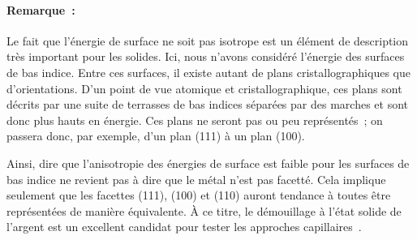\paragraph*{Remarque~:} Le fait que l'énergie de surface ne soit pas isotrope est un élément de description très important pour les solides. Ici, nous n'avons considéré l'énergie des surfaces de bas indice. Entre ces surfaces, il existe autant de plans cristallographiques que d'orientations. D'un point de vue atomique et cristallographique, ces plans sont décrits par une suite de terrasses de bas indices séparées par des marches et sont donc plus hauts en énergie. Ces plans ne seront pas ou peu représentés~; on passera donc, par exemple, d'un plan (111) à un plan (100).\par 
Ainsi, dire que l'anisotropie des énergies de surface est faible pour les surfaces de bas indice ne revient pas à dire que le métal n'est pas facetté. Cela implique seulement que les facettes (111), (100) et (110) auront tendance à toutes être représentées de manière équivalente. À ce titre, le démouillage à l'état solide de l'argent est un excellent candidat pour tester les approches capillaires~\cite{brandon1966mobility}.\par 

